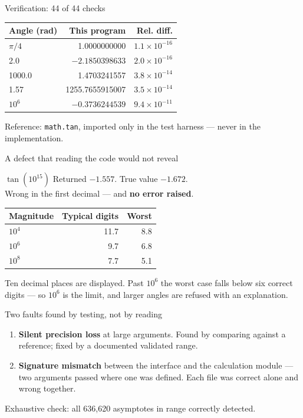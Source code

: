 \documentclass{beamer}
\begin{document}
\begin{frame}{Verification: 44 of 44 checks}
  \centering
  \small
  \begin{tabular}{lrr}
    \toprule
    \textbf{Angle (rad)} & \textbf{This program} &
    \textbf{Rel. diff.} \\
    \midrule
    $\pi/4$   & 1.0000000000    & $1.1\times10^{-16}$ \\
    2.0       & $-2.1850398633$ & $2.0\times10^{-16}$ \\
    1000.0    & 1.4703241557    & $3.8\times10^{-14}$ \\
    1.57      & 1255.7655915007 & $3.5\times10^{-14}$ \\
    $10^{6}$  & $-0.3736244539$ & $9.4\times10^{-11}$ \\
    \bottomrule
  \end{tabular}
  \vfill
  \footnotesize
  Reference: \texttt{math.tan}, imported only in the test harness ---
  never in the implementation.
\end{frame}

\begin{frame}{A defect that reading the code would not reveal}
  \begin{block}{$\tan(10^{15})$}
    Returned $-1.557$. True value $-1.672$.\\
    Wrong in the first decimal --- and \textbf{no error raised}.
  \end{block}
  \vfill
  \centering
  \small
  \begin{tabular}{lrr}
    \toprule
    \textbf{Magnitude} & \textbf{Typical digits} & \textbf{Worst} \\
    \midrule
    $10^{4}$ & 11.7 & 8.8 \\
    $10^{6}$ & 9.7  & 6.8 \\
    $10^{8}$ & 7.7  & 5.1 \\
    \bottomrule
  \end{tabular}
  \vfill
  \footnotesize
  Ten decimal places are displayed. Past $10^{6}$ the worst case
  falls below six correct digits --- so $10^{6}$ is the limit, and
  larger angles are refused with an explanation.
\end{frame}

\begin{frame}{Two faults found by testing, not by reading}
  \begin{enumerate}
    \item \textbf{Silent precision loss} at large arguments.
          Found by comparing against a reference; fixed by a
          documented validated range.
    \item \textbf{Signature mismatch} between the interface and the
          calculation module --- two arguments passed where one was
          defined. Each file was correct alone and wrong together.
  \end{enumerate}
  \vfill
  \begin{center}
    Exhaustive check: all 636{,}620 asymptotes in range
    correctly detected.
  \end{center}
\end{frame}
\end{document}
